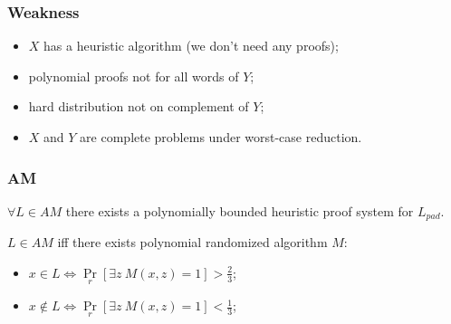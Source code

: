 \begin{frame}
	\frametitle{Weakness}

    \begin{itemize}
    	\item $X$ has a heuristic algorithm (we don't need any proofs);
    	\item polynomial proofs not for all words of $Y$;
    	\item hard distribution not on complement of $Y$;
    	\item $X$ and $Y$ are complete problems under {\color{blue}worst-case}
		    reduction.
    \end{itemize}
\end{frame}


\begin{frame}
    \frametitle{AM}
    
    \begin{theorem}
		$\forall L \in AM$ there exists a polynomially bounded heuristic proof system
        for $L_{pad}$.
    \end{theorem}


    \begin{definition}
    	$L \in AM$ iff there exists polynomial randomized algorithm
        $M$:
        \begin{itemize}
			\item $x \in L \Leftrightarrow
        		\Pr\limits_{r}[\exists z~ M(x, z) = 1] 
        		> \frac{2}{3}$;
            \item $x \notin L \Leftrightarrow
        		\Pr\limits_{r}[\exists z~ M(x, z) = 1] 
        		< \frac{1}{3}$;
        \end{itemize}
    \end{definition}
    
\end{frame}

